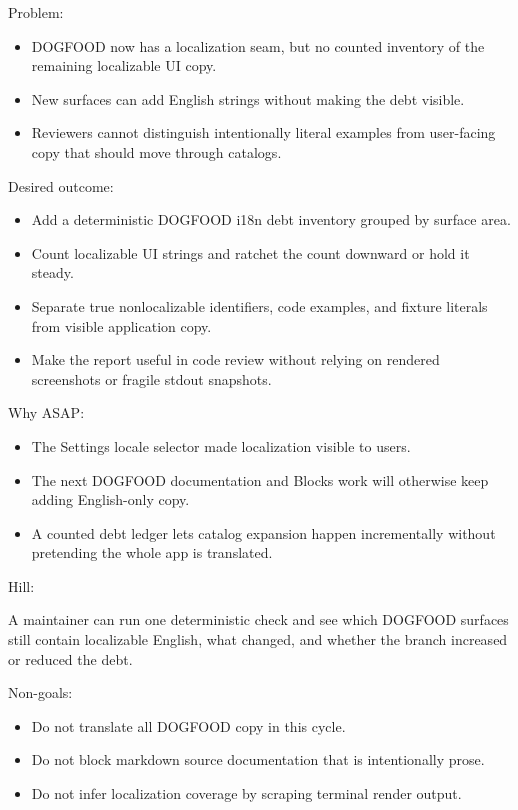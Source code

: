Problem:

\begin{itemize}
\tightlist
\item
  DOGFOOD now has a localization seam, but no counted inventory of the remaining localizable UI copy.
\item
  New surfaces can add English strings without making the debt visible.
\item
  Reviewers cannot distinguish intentionally literal examples from user-facing copy that should move through catalogs.
\end{itemize}

Desired outcome:

\begin{itemize}
\tightlist
\item
  Add a deterministic DOGFOOD i18n debt inventory grouped by surface area.
\item
  Count localizable UI strings and ratchet the count downward or hold it steady.
\item
  Separate true nonlocalizable identifiers, code examples, and fixture literals from visible application copy.
\item
  Make the report useful in code review without relying on rendered screenshots or fragile stdout snapshots.
\end{itemize}

Why ASAP:

\begin{itemize}
\tightlist
\item
  The Settings locale selector made localization visible to users.
\item
  The next DOGFOOD documentation and Blocks work will otherwise keep adding English-only copy.
\item
  A counted debt ledger lets catalog expansion happen incrementally without pretending the whole app is translated.
\end{itemize}

Hill:

A maintainer can run one deterministic check and see which DOGFOOD surfaces still contain localizable English, what changed, and whether the branch increased or reduced the debt.

Non-goals:

\begin{itemize}
\tightlist
\item
  Do not translate all DOGFOOD copy in this cycle.
\item
  Do not block markdown source documentation that is intentionally prose.
\item
  Do not infer localization coverage by scraping terminal render output.
\end{itemize}

